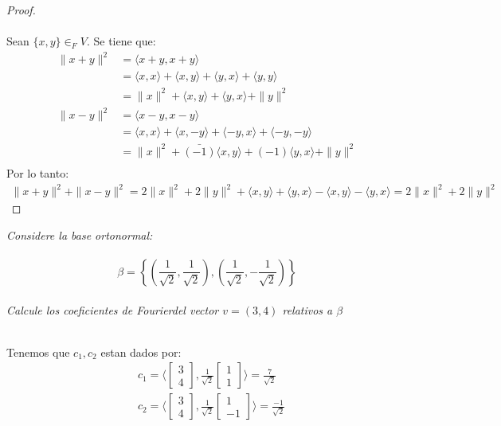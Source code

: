 \documentclass[11pt,letterpaper]{article}
\begin{document}
\begin{proof}\,\\
	\,\\
Sean $\{x,y\}\in _FV$. Se tiene que:
\begin{align*}
    \| x + y \|^2&=\langle x+y,x+y \rangle\\
    &=\langle x,x \rangle + \langle x,y \rangle + \langle y,x \rangle + \langle y,y \rangle\\
    &=\|x\|^2 + \langle x,y \rangle + \langle y,x \rangle + \|y\|^2\\
    \| x - y \|^2&=\langle x-y,x-y \rangle\\
    &=\langle x,x \rangle + \langle x,-y \rangle + \langle -y,x \rangle + \langle -y,-y \rangle\\
    &=\|x\|^2 + \bar{(-1)} \langle x,y \rangle + (-1)\langle y,x \rangle + \|y\|^2\\
\end{align*}
Por lo tanto:
\begin{align*}
    \| x + y \|^2 + \| x - y \|^2 = 2\|x\|^2 + 2\|y\|^2 + \langle x,y \rangle + \langle y,x \rangle - \langle x,y \rangle - \langle y,x \rangle= 2\|x\|^2 + 2\|y\|^2
\end{align*}
\end{proof}

\begin{tcolorbox}[
	title = \textcolor{black}{\textcolor{white}{Problema 8}},]
\textit{Considere la base ortonormal:\,\\
\,\\
\begin{equation*}
	\beta=\left\{\left(\frac{1}{\sqrt{2}},\frac{1}{\sqrt{2}}\right),\left(\frac{1}{\sqrt{2}},-\frac{1}{\sqrt{2}}\right)\right\}
\end{equation*}\,\\
Calcule los coeficientes de Fourierdel vector $v=(3,4)$ relativos a $\beta$
}
\end{tcolorbox}\,\\

Tenemos que $c_1, c_2$ estan dados por:
\begin{align*}
    &c_1=\langle \begin{bmatrix} 3\\4 \end{bmatrix}, \frac{1}{\sqrt{2}} \begin{bmatrix} 1\\1 \end{bmatrix} \rangle = \frac{7}{\sqrt{2}} \\
    &c_2=\langle \begin{bmatrix} 3\\4 \end{bmatrix}, \frac{1}{\sqrt{2}} \begin{bmatrix} 1\\-1 \end{bmatrix} \rangle = \frac{-1}{\sqrt{2}}
\end{align*}
\end{document}
